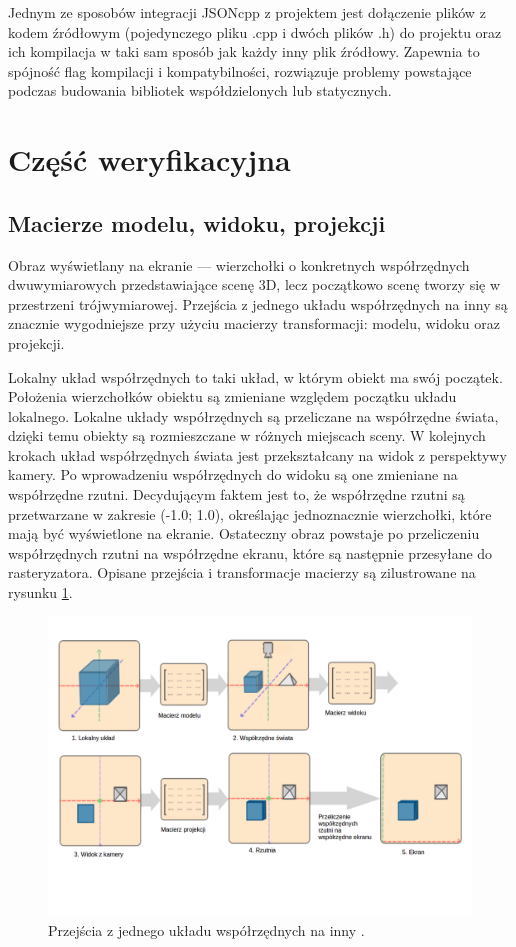 Jednym ze sposobów integracji JSONcpp z projektem jest dołączenie plików z kodem źródłowym (pojedynczego pliku .cpp i dwóch plików .h) do projektu oraz ich kompilacja w taki sam sposób jak każdy inny plik źródłowy. Zapewnia to spójność flag kompilacji i kompatybilności, rozwiązuje problemy powstające podczas budowania bibliotek współdzielonych lub statycznych.

\newpage
\section{Część weryfikacyjna}
\subsection{Macierze modelu, widoku, projekcji}
Obraz wyświetlany na ekranie --- wierzchołki o konkretnych współrzędnych dwuwymiarowych przedstawiające scenę 3D, lecz początkowo scenę tworzy się w przestrzeni trójwymiarowej. Przejścia z jednego układu współrzędnych na inny są znacznie wygodniejsze przy użyciu macierzy transformacji: modelu, widoku oraz projekcji.

Lokalny układ współrzędnych to taki układ, w którym obiekt ma swój początek. Położenia wierzchołków obiektu są zmieniane względem początku układu lokalnego. Lokalne układy współrzędnych są przeliczane na współrzędne świata, dzięki temu obiekty są rozmieszczane w różnych miejscach sceny. W kolejnych krokach układ współrzędnych świata jest przekształcany na widok z perspektywy kamery. Po wprowadzeniu współrzędnych do widoku są one zmieniane na współrzędne rzutni. Decydującym faktem jest to, że współrzędne rzutni są przetwarzane w zakresie (-1.0; 1.0), określając jednoznacznie wierzchołki, które mają być wyświetlone na ekranie. Ostateczny obraz powstaje po przeliczeniu współrzędnych rzutni na współrzędne ekranu, które są następnie przesyłane do rasteryzatora. Opisane przejścia i transformacje macierzy są zilustrowane na rysunku \ref{rys11}.

\begin{figure}[H]
		\centering
 		\includegraphics[width=16.0cm]{coordinate_systems.png}
    	\caption{Przejścia z jednego układu współrzędnych na inny \cite{opengltutorial}.}
 		\label{rys11}
\end{figure}

